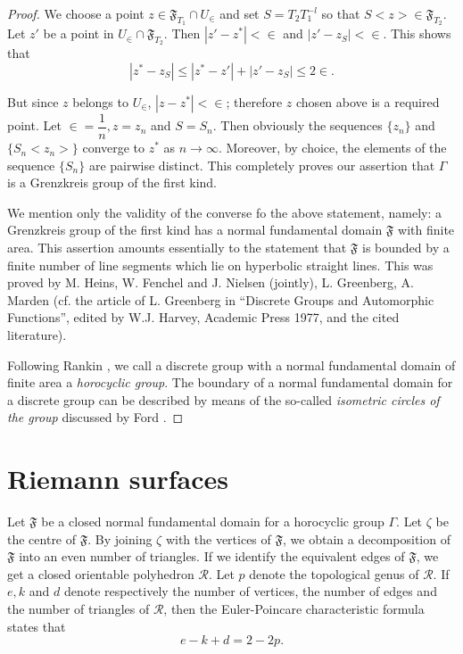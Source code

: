\begin{proof}
We choose a point $z\in \mathfrak{F}_{T_1} \cap
U_{\in}$ and set $S=T_2 T^{-l}_1$ so that $S<z>\in
\mathfrak{F}_{T_2}$. Let $z'$ be a point in $U_{\in} \cap
  \mathfrak{F}_{T_2}$. Then $|z'-z^{\ast}|<\in$ and
  $|z'-z_S|<\in$. This shows that 
$$
|z^{\ast} - z_S|\leq |z^{\ast} - z'| + |z'-z_S| \leq 2 \in.
$$

But \pageoriginale since $z$ belongs to $U_{\in}$,
$|z-z^{\ast}|<\in$; therefore $z$ chosen above is a required
point. Let $\in =\dfrac{1}{n}, z=z_n$ and $S= S_n$. Then
obviously the sequences $\{z_n\}$ and $\{S_n <z_n>\}$ converge to
$z^{\ast}$ as $n\to \infty$. Moreover, by choice, the elements of the
sequence $\{S_n\}$ are pairwise distinct. This completely proves our
assertion that $\Gamma$ is a Grenzkreis group of the first kind.

We mention only the validity of the converse fo the above statement,
namely: a Grenzkreis group of the first kind has a normal fundamental
domain $\mathfrak{F}$ with finite area. This assertion amounts
essentially to the statement that $\mathfrak{F}$ is bounded by a finite
number of line segments which lie on hyperbolic straight lines. This
was proved by M. Heins, W. Fenchel and J. Nielsen (jointly),
L. Greenberg, A. Marden (cf. the article of L. Greenberg in ``Discrete
Groups and Automorphic Functions'', edited by W.J. Harvey, Academic
Press 1977, and the cited literature).

Following Rankin \cite{c1:key6}, we call a discrete group with a normal
fundamental domain of finite area a \textit{horocyclic group}. The
boundary of a normal fundamental domain for a discrete group can be
described by means of the so-called \textit{isometric circles of the
  group} discussed by Ford \cite{c1:key1}.
\end{proof}

\section{Riemann surfaces}\label{chap1:sec4}%
Let $\mathfrak{F}$ be a closed normal fundamental domain for a
horocyclic group $\Gamma$. Let $\zeta$ be the centre of
$\mathfrak{F}$. By joining $\zeta$ with the vertices of
$\mathfrak{F}$, we \pageoriginale obtain a decomposition of
$\mathfrak{F}$ into an even number of triangles. If we identify the
equivalent edges of $\mathfrak{F}$, we get a closed orientable
polyhedron $\mathscr{R}$. Let $p$ denote the topological genus of
$\mathscr{R}$. If $e,k$ and $d$ denote respectively the number of
vertices, the number of edges and the number of triangles of
$\mathscr{R}$, then the Euler-Poincare characteristic formula states
that 
$$
e-k+d=2-2p.
$$

